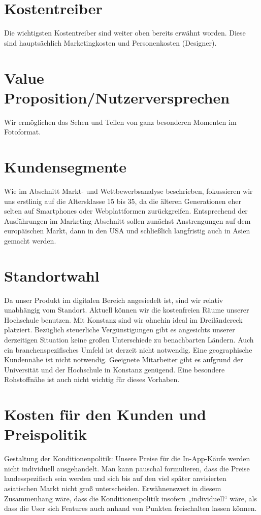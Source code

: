 \section{Kostentreiber}
Die wichtigsten Kostentreiber sind weiter oben bereits erwähnt worden. Diese sind hauptsächlich Marketingkosten und Personenkosten (Designer).


\section{Value Proposition/Nutzerversprechen}
Wir ermöglichen das Sehen und Teilen von ganz besonderen Momenten im Fotoformat.


\section{Kundensegmente}
Wie im Abschnitt Markt- und Wettbewerbsanalyse beschrieben, fokussieren wir uns erstlinig auf die Altersklasse 15 bis 35, da die älteren Generationen eher selten auf Smartphones oder Webplattformen zurückgreifen. Entsprechend der Ausführungen im Marketing-Abschnitt sollen zunächst Anstrengungen auf dem europäischen Markt, dann in den USA und schließlich langfristig auch in Asien gemacht werden.


\section{Standortwahl}
Da unser Produkt im digitalen Bereich angesiedelt ist, sind wir relativ unabhängig vom Standort. Aktuell können wir die kostenfreien Räume unserer Hochschule benutzen. Mit Konstanz sind wir ohnehin ideal im Dreiländereck platziert. Bezüglich steuerliche Vergünstigungen gibt es angesichts unserer derzeitigen Situation keine großen Unterschiede zu benachbarten Ländern. Auch ein branchenspezifisches Umfeld ist derzeit nicht notwendig. Eine geographische Kundennähe ist nicht notwendig. Geeignete Mitarbeiter gibt es aufgrund der Universität und der Hochschule in Konstanz genügend. Eine besondere Rohstoffnähe ist auch nicht wichtig für dieses Vorhaben.



\section{Kosten für den Kunden und Preispolitik}
Gestaltung der Konditionenpolitik: Unsere Preise für die In-App-Käufe werden nicht individuell ausgehandelt. Man kann pauschal formulieren, dass die Preise landesspezifisch sein werden und sich bis auf den viel später anvisierten asiatischen Markt nicht groß unterscheiden.
Erwähnenswert in diesem Zusammenhang wäre, dass die Konditionenpolitik insofern „individuell“ wäre, als dass die User sich Features auch anhand von Punkten freischalten lassen können.

